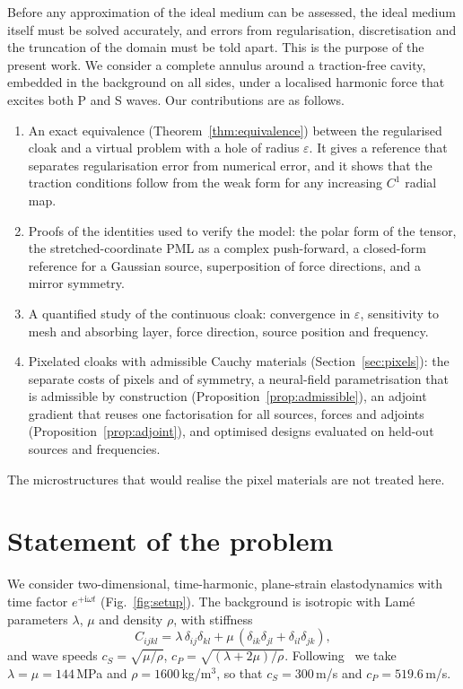 \documentclass[preprint,12pt]{elsarticle}
\newcommand{\be}{\begin{equation}}
\newcommand{\ee}{\end{equation}}
\begin{document}
Before any approximation of the ideal medium can be assessed, the ideal medium itself must be solved
accurately, and errors from regularisation, discretisation and the truncation of the domain must be told
apart. This is the purpose of the present work. We consider a complete annulus around a
traction-free cavity, embedded in the background on all sides, under a localised harmonic force
that excites both P and S waves. Our contributions are as follows.
\begin{enumerate}
\item An exact equivalence (Theorem~\ref{thm:equivalence}) between the regularised cloak and a
virtual problem with a hole of radius $\varepsilon$. It gives a reference that separates
regularisation error from numerical error, and it shows that the traction conditions follow from the
weak form for any increasing $C^1$ radial map.
\item Proofs of the identities used to verify the model: the polar form of the tensor, the
stretched-coordinate PML as a complex push-forward, a closed-form reference for a Gaussian source,
superposition of force directions, and a mirror symmetry.
\item A quantified study of the continuous cloak: convergence in $\varepsilon$, sensitivity to mesh
and absorbing layer, force direction, source position and frequency.
\end{enumerate}
\begin{enumerate}
\setcounter{enumi}{3}
\item Pixelated cloaks with admissible Cauchy materials (Section~\ref{sec:pixels}): the separate costs of pixels and of
symmetry, a neural-field parametrisation that is admissible by construction (Proposition~\ref{prop:admissible}), an
adjoint gradient that reuses one factorisation for all sources, forces and adjoints (Proposition~\ref{prop:adjoint}), and
optimised designs evaluated on held-out sources and frequencies.
\end{enumerate}
The microstructures that would realise the pixel materials are not treated here.

\section{Statement of the problem}\label{sec:problem}

We consider two-dimensional, time-harmonic, plane-strain elastodynamics with time factor
$e^{+\mathrm{i}\omega t}$ (Fig.~\ref{fig:setup}). The background is isotropic with Lam\'e parameters
$\lambda$, $\mu$ and density $\rho$, with stiffness
\be\label{eq:C0}
  C_{ijkl}=\lambda\,\delta_{ij}\delta_{kl}+\mu\,(\delta_{ik}\delta_{jl}+\delta_{il}\delta_{jk}),
\ee
and wave speeds $c_S=\sqrt{\mu/\rho}$, $c_P=\sqrt{(\lambda+2\mu)/\rho}$. Following~\citet{chatzopoulos2023}
we take $\lambda=\mu=144$\,MPa and $\rho=1600$\,kg/m$^3$, so that $c_S=300$\,m/s and $c_P=519.6$\,m/s.
\end{document}
